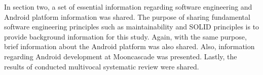 In section two, a set of essential information regarding software engineering and Android platform information was shared. The purpose of sharing fundamental software engineering principles such as maintainability and SOLID principles is to provide background information for this study. Again, with the same purpose, brief information about the Android platform was also shared. Also, information regarding Android development at Mooncascade was presented. Lastly, the results of conducted multivocal systematic review were shared.